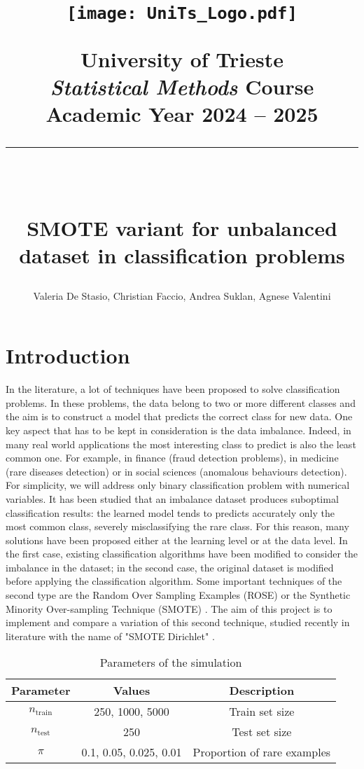 \documentclass{article}
\date{}
\title{
	\begin{center}
  		\texttt{[image: UniTs\_Logo.pdf]}\\
\begin{figure}
  		    \centering
  		    \label{fig:enter-label}
  		\end{figure}
  		  		\smallskip
  		\Large {University of Trieste}\\
		\smallskip
  		\large \textit{Statistical Methods} Course\\
		\smallskip
		\small Academic Year 2024 -- 2025\\
  		\rule{9cm}{.4pt}\\
		\medskip
  	\end{center}
	SMOTE variant for unbalanced dataset in classification problems 
}
\author{Valeria De Stasio, Christian Faccio, Andrea Suklan, Agnese Valentini}
\begin{document}
\maketitle

\section{Introduction}
\label{sec:introduction}
In the literature, a lot of techniques have been proposed to solve classification problems. In these problems, the data belong to two or more different classes and the aim is to construct a model that predicts the correct class for new data.
One key aspect that has to be kept in consideration is the data imbalance. Indeed, in many real world applications the most interesting class to predict is also the least common one. For example, in finance (fraud detection problems), in medicine (rare diseases detection) or in social sciences (anomalous behaviours detection). For simplicity, we will address only binary classification problem with numerical variables.
It has been studied that an imbalance dataset produces suboptimal classification results: the learned model tends to predicts accurately only the most common class, severely misclassifying the rare class. For this reason, many solutions have been proposed either at the learning level or at the data level. 
In the first case, existing classification algorithms have been modified to consider the imbalance in the dataset; in the second case, the original dataset is modified before applying the classification algorithm.
Some important techniques of the second type are the Random Over Sampling Examples (ROSE) \cite{lunardon2014rose} or the Synthetic Minority Over-sampling Technique (SMOTE) \cite{chawla2002smote}. 
The aim of this project is to implement and compare a variation of this second technique, studied recently in literature with the name of "SMOTE Dirichlet" \cite{matharaarachchi2024enhancing}. 



\begin{table}[h]
\centering
\begin{tabular}{|c|c|c|}
\hline
Parameter & Values & Description \\ 
\hline
$n_\text{train}$ & 250, 1000, 5000 & Train set size \\  
$n_\text{test}$ & 250 & Test set size \\
$\pi$ & 0.1, 0.05, 0.025, 0.01 & Proportion of rare examples \\
\hline
\end{tabular}
\caption{Parameters of the simulation}
\label{table:parameters}
\end{table}
\end{document}
